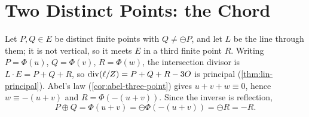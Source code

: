 \section{Two Distinct Points: the Chord}
\label{sec:cases-chord}

Let \(P, Q \in E\) be distinct finite points with \(Q \ne \ominus P\), and let
\(L\) be the line through them; it is not vertical, so it meets \(E\) in a third
finite point \(R\). Writing \(P = \Phi(u)\), \(Q = \Phi(v)\), \(R = \Phi(w)\), the
intersection divisor is \(L \cdot E = P + Q + R\), so \(\operatorname{div}(\ell/Z) =
P + Q + R - 3O\) is principal (\cref{thm:lin-principal}). Abel's law
(\cref{cor:abel-three-point}) gives \(u + v + w \equiv 0\), hence
\(w \equiv -(u+v)\) and \(R = \Phi(-(u+v))\). Since the inverse is reflection,
\[
  P \oplus Q = \Phi(u+v) = \ominus\Phi(-(u+v)) = \ominus R = -R .
\]

